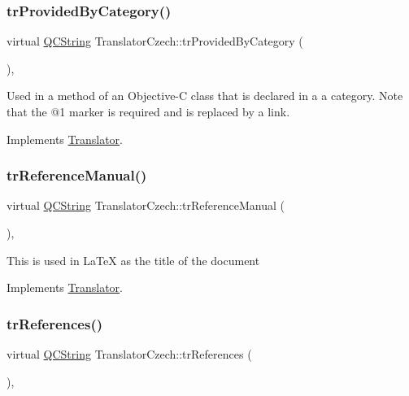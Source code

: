 \subsubsection{\texorpdfstring{trProvidedByCategory()}{trProvidedByCategory()}}
{\footnotesize\ttfamily virtual \mbox{\hyperlink{class_q_c_string}{Q\+C\+String}} Translator\+Czech\+::tr\+Provided\+By\+Category (\begin{DoxyParamCaption}{ }\end{DoxyParamCaption})\hspace{0.3cm}{\ttfamily [inline]}, {\ttfamily [virtual]}}

Used in a method of an Objective-\/C class that is declared in a a category. Note that the @1 marker is required and is replaced by a link. 

Implements \mbox{\hyperlink{class_translator}{Translator}}.

\mbox{\label{class_translator_czech_a367e27ab4a239d32ce679b20dc8a5faa}} 
\subsubsection{\texorpdfstring{trReferenceManual()}{trReferenceManual()}}
{\footnotesize\ttfamily virtual \mbox{\hyperlink{class_q_c_string}{Q\+C\+String}} Translator\+Czech\+::tr\+Reference\+Manual (\begin{DoxyParamCaption}{ }\end{DoxyParamCaption})\hspace{0.3cm}{\ttfamily [inline]}, {\ttfamily [virtual]}}

This is used in La\+TeX as the title of the document 

Implements \mbox{\hyperlink{class_translator}{Translator}}.

\mbox{\label{class_translator_czech_a35abf3f6fe6ad59907dc7bc5265e872f}} 
\subsubsection{\texorpdfstring{trReferences()}{trReferences()}}
{\footnotesize\ttfamily virtual \mbox{\hyperlink{class_q_c_string}{Q\+C\+String}} Translator\+Czech\+::tr\+References (\begin{DoxyParamCaption}{ }\end{DoxyParamCaption})\hspace{0.3cm}{\ttfamily [inline]}, {\ttfamily [virtual]}}

